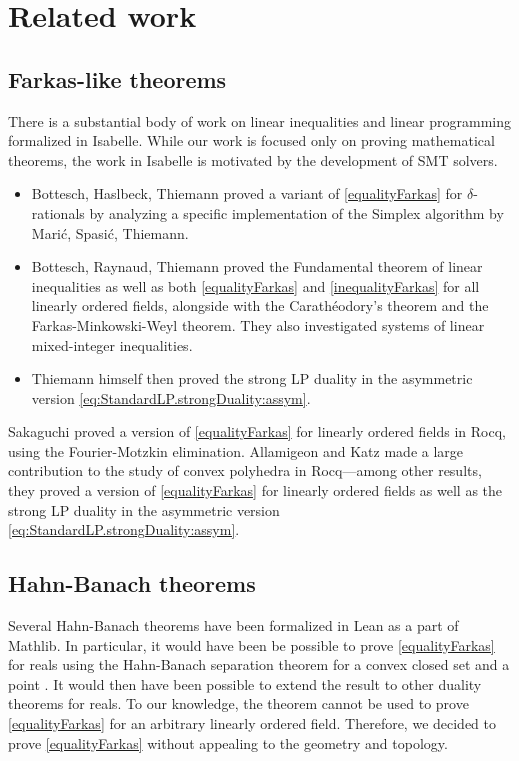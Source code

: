 \documentclass[]{article}
\renewcommand{\.}{\hskip .75pt}
\begin{document}
\section {Related work}

\subsection{Farkas-like theorems}

There is a substantial body of work on linear inequalities and
linear programming formalized in Isabelle.
While our work is focused only on proving mathematical theorems,
the work in Isabelle is motivated by the development of SMT solvers.

\begin{itemize}
\item 
Bottesch, Haslbeck, Thiemann \cite{Farkas-AFP} proved a variant of
\ref{equalityFarkas} for $\delta$-rationals
by analyzing a specific implementation of the Simplex algorithm
\cite{Simplex-AFP} by Marić, Spasić, Thiemann.
\item
Bottesch, Raynaud, Thiemann \cite{Linear-AFP} proved
the Fundamental theorem of linear inequalities as well
as both \ref{equalityFarkas} and \ref{inequalityFarkas}
for all linearly ordered fields, alongside with
the Carathéodory’s theorem and the Farkas-Minkowski-Weyl theorem.
They also investigated systems of linear mixed-integer inequalities.
\item 
Thiemann himself \cite{Duality-AFP} then proved the strong LP duality
in the asymmetric version \eqref{eq:StandardLP.strongDuality:assym}.
\end{itemize}

Sakaguchi \cite{Vass-Coq} proved a version of \ref{equalityFarkas}
for linearly ordered fields in Rocq, using the Fourier-Motzkin elimination.
Allamigeon and Katz \cite{Simplex-Coq} made a large contribution to
the study of convex polyhedra in Rocq\:---\:among
other results, they proved a version of \ref{equalityFarkas}
for linearly ordered fields as well as the strong LP duality
in the asymmetric version \eqref{eq:StandardLP.strongDuality:assym}.

\subsection{Hahn-Banach theorems}

Several Hahn-Banach theorems have been formalized in Lean as a part of
Mathlib.
In particular, it would have been be possible to prove \ref{equalityFarkas}
for reals using the Hahn-Banach separation theorem for a convex closed set
and a point \cite{HahnBanach-Lean}.
It would then have been possible to extend the result to other
duality theorems for reals.
To our knowledge, the theorem \cite{HahnBanach-Lean} cannot be used
to prove \ref{equalityFarkas} for an arbitrary linearly ordered field.
Therefore, we decided to prove \ref{equalityFarkas} without appealing to
the geometry and topology.
\end{document}
